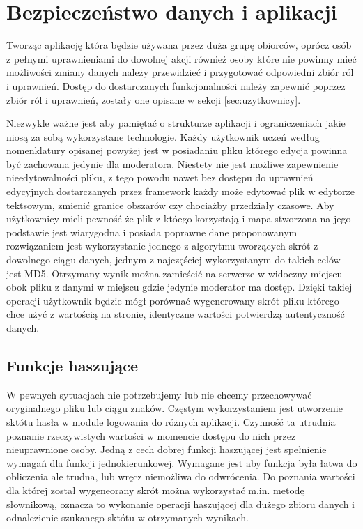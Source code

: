 \clearpage
\newpage
\section{Bezpieczeństwo danych i aplikacji}
\label{sec:bezpieczenstwo}

Tworząc aplikację która będzie używana przez duża grupę obiorców, oprócz osób z pełnymi uprawnieniami do dowolnej akcji również osoby które nie powinny mieć możliwości zmiany danych należy przewidzieć i przygotować odpowiedni zbiór ról i uprawnień. Dostęp do dostarczanych funkcjonalności należy zapewnić poprzez zbiór ról i uprawnień, zostały one opisane w sekcji \ref{sec:uzytkownicy}.

Niezwykle ważne jest aby pamiętać o strukturze aplikacji i ograniczeniach jakie niosą za sobą wykorzystane technologie. Każdy użytkownik uczeń według nomenklatury opisanej powyżej jest w posiadaniu pliku którego edycja powinna być zachowana jedynie dla moderatora. Niestety nie jest możliwe zapewnienie nieedytowalności pliku, z tego powodu nawet bez dostępu do uprawnień edycyjnych dostarczanych przez framework każdy może edytować plik w edytorze tektsowym, zmienić granice obszarów czy chociażby przedziały czasowe. Aby użytkownicy mieli pewność że plik z któego korzystają i mapa stworzona na jego podstawie jest wiarygodna i posiada poprawne dane proponowanym rozwiązaniem jest wykorzystanie jednego z algorytmu tworzących skrót z dowolnego ciągu danych, jednym z najczęściej wykorzystanym do takich celów jest MD5. Otrzymany wynik można zamieścić na serwerze w widoczny miejscu obok pliku z danymi w miejscu gdzie jedynie moderator ma dostęp. Dzięki takiej operacji użytkownik będzie mógł porównać wygenerowany skrót pliku którego chce użyć z wartością na stronie, identyczne wartości potwierdzą autentyczność danych.

\subsection{Funkcje haszujące}
\label{sec:hashfunction}

W pewnych sytuacjach nie potrzebujemy lub nie chcemy przechowywać oryginalnego pliku lub ciągu znaków. Częstym wykorzystaniem jest utworzenie sktótu hasła w module logowania do różnych aplikacji. Czynność ta utrudnia poznanie rzeczywistych wartości w momencie dostępu do nich przez nieuprawnione osoby. Jedną z cech dobrej funkcji haszującej jest
spełnienie wymagań dla funkcji jednokierunkowej. Wymagane jest aby funkcja była łatwa do obliczenia ale trudna, lub wręcz niemożliwa do odwrócenia.
Do poznania wartości dla której został wygeneorany skrót można wykorzystać m.in. metodę słownikową, oznacza to wykonanie operacji haszującej dla dużego zbioru danych i odnalezienie szukanego sktótu w otrzymanych wynikach.

